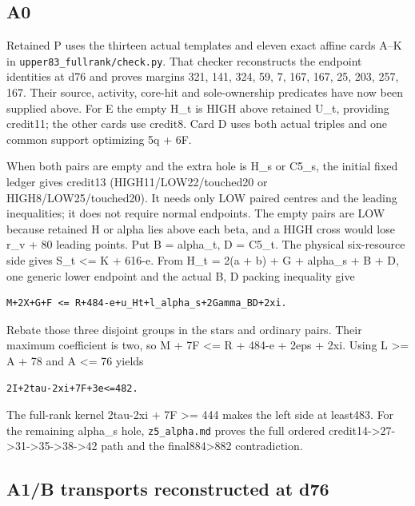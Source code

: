 \documentclass[11pt,a4paper]{article}
\begin{document}
\hypertarget{a0}{%
\subsection{A0}\label{a0}}

Retained P uses the thirteen actual templates and eleven exact affine
cards A--K in \texttt{upper83\_fullrank/check.py}. That checker
reconstructs the endpoint identities at d76 and proves margins 321, 141,
324, 59, 7, 167, 167, 25, 203, 257, 167. Their source, activity,
core-hit and sole-ownership predicates have now been supplied above. For
E the empty H\_t is HIGH above retained U\_t, providing credit11; the
other cards use credit8. Card D uses both actual triples and one common
support optimizing 5q + 6F.

When both pairs are empty and the extra hole is H\_s or C5\_s, the
initial fixed ledger gives credit13 (HIGH11/LOW22/touched20 or
HIGH8/LOW25/touched20). It needs only LOW paired centres and the leading
inequalities; it does not require normal endpoints. The empty pairs are
LOW because retained H or alpha lies above each beta, and a HIGH cross
would lose r\_v + 80 leading points. Put B = alpha\_t, D = C5\_t. The
physical six-resource side gives S\_t \textless= K + 616-e. From H\_t =
2(a + b) + G + alpha\_s + B + D, one generic lower endpoint and the
actual B, D packing inequality give

\begin{verbatim}
M+2X+G+F <= R+484-e+u_Ht+l_alpha_s+2Gamma_BD+2xi.
\end{verbatim}

Rebate those three disjoint groups in the stars and ordinary pairs.
Their maximum coefficient is two, so M + 7F \textless= R + 484-e + 2eps
+ 2xi. Using L \textgreater= A + 78 and A \textless= 76 yields

\begin{verbatim}
2I+2tau-2xi+7F+3e<=482.
\end{verbatim}

The full-rank kernel 2tau-2xi + 7F \textgreater= 444 makes the left side
at least483. For the remaining alpha\_s hole, \texttt{z5\_alpha.md}
proves the full ordered
credit14-\textgreater27-\textgreater31-\textgreater35-\textgreater38-\textgreater42
path and the final884\textgreater882 contradiction.

\hypertarget{a1b-transports-reconstructed-at-d76}{%
\subsection{A1/B transports reconstructed at
d76}\label{a1b-transports-reconstructed-at-d76}}
\end{document}
